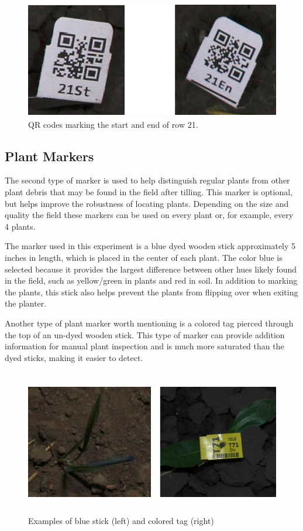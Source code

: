 \begin{figure}[htb]
	\centering
    \includegraphics[height=2in]{figures/row_codes.jpg}
    \caption[Row QR codes]{QR codes marking the start and end of row 21.}
    \label{figure:row_codes}
\end{figure}

\subsection{Plant Markers}
\label{section:plant_markers}

The second type of marker is used to help distinguish regular plants from other plant debris that may be found in the field after tilling.  This marker is optional, but helps improve the robustness of locating plants.  Depending on the size and quality the field these markers can be used on every plant or, for example, every 4 plants. 

The marker used in this experiment is a blue dyed wooden stick approximately 5 inches in length, which is placed in the center of each plant. The color blue is selected because it provides the largest difference between other hues likely found in the field, such as yellow/green in plants and red in soil.  In addition to marking the plants, this stick also helps prevent the plants from flipping over when exiting the planter.

Another type of plant marker worth mentioning is a colored tag pierced through the top of an un-dyed wooden stick.  This type of marker can provide addition information for manual plant inspection and is much more saturated than the dyed sticks, making it easier to detect. 

\begin{figure}[htb]
	\centering
    \includegraphics[height=2.5in]{figures/plant_markers.jpg}
    \caption[Plant markers]{Examples of blue stick (left) and colored tag (right)}
    \label{figure:plant_markers}
\end{figure}
